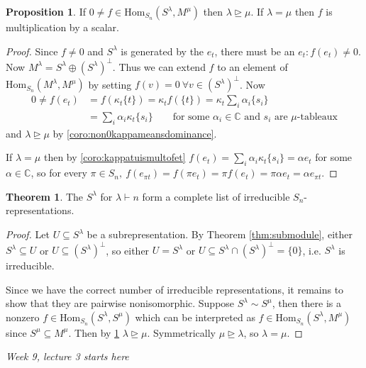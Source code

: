 \documentclass{article}
\newcommand{\C}{\mathbb{C}}
\newcommand{\Hom}{\text{Hom}}
\theoremstyle{definition}
\newtheorem{prop}[defn]{Proposition}
\newtheorem{thm}[defn]{Theorem}
\begin{document}
\begin{prop}
\label{prop:non0homSlamMmumeansdom}
If $0\neq f\in \Hom_{S_n}(S^\lambda,M^\mu)$ then $\lambda\unrhd\mu$. If $\lambda=\mu$ then $f$ is multiplication by a scalar.
\end{prop}
\begin{proof}
Since $f\neq 0$ and $S^\lambda$ is generated by the $e_t$, there must be an $e_t:f(e_t)\neq 0$. Now $M^\lambda=S^\lambda\oplus(S^\lambda)^\perp$. Thus we can extend $f$ to an element of $\Hom_{S_n}(M^\lambda,M^\mu)$ by setting $f(v)=0 \ \forall v\in(S^\lambda)^\perp$. Now
\[
\begin{aligned}
0\neq f(e_t)&=f(\kappa_t\{t\})=\kappa_t f(\{t\})=\kappa_t\sum_i\alpha_i\{s_i\}\\
&=\sum_i\alpha_i\kappa_t\{s_i\} \qquad\text{for some }\alpha_i\in\C\text{ and }s_i\text{ are }\mu\text{-tableaux}
\end{aligned}
\]
and $\lambda\unrhd\mu$ by \ref{coro:non0kappameansdominance}.

If $\lambda=\mu$ then by \ref{coro:kappatuismultofet} $f(e_t)=\sum_i\alpha_i\kappa_t\{s_i\}=\alpha e_t$ for some $\alpha\in\C$, so for every $\pi\in S_n,\ f(e_{\pi t})=f(\pi e_t)=\pi f(e_t)=\pi\alpha e_t=\alpha e_{\pi t}$.
\end{proof}

\begin{thm}
The $S^\lambda$ for $\lambda\vdash n$ form a complete list of irreducible $S_n$-representations.
\end{thm}
\begin{proof}
Let $U\subseteq S^\lambda$ be a subrepresentation. By Theorem \ref{thm:submodule}, either $S^\lambda\subseteq U$ or $U\subseteq (S^\lambda)^\perp$, so either $U=S^\lambda$ or $U\subseteq S^\lambda\cap (S^\lambda)^\perp=\{0\}$, i.e. $S^\lambda$ is irreducible.

Since we have the correct number of irreducible representations, it remains to show that they are pairwise nonisomorphic. Suppose $S^\lambda\sim S^\mu$, then there is a nonzero $f\in\Hom_{S_n}(S^\lambda,S^\mu)$ which can be interpreted as $f\in\Hom_{S_n}(S^\lambda,M^\mu)$ since $S^\mu\subseteq M^\mu$. Then by \ref{prop:non0homSlamMmumeansdom} $\lambda\unrhd\mu$. Symmetrically $\mu\unrhd\lambda$, so $\lambda=\mu$.
\end{proof}

\begin{flushright}
\textit{Week 9, lecture 3 starts here}
\end{flushright}
\end{document}
